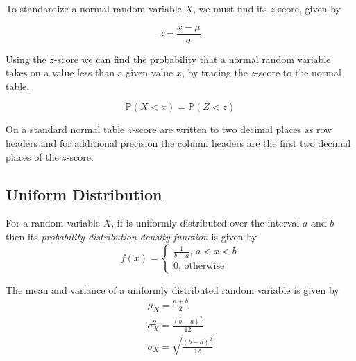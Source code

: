 \documentclass[12pt letter]{report}
\begin{document}


To standardize a normal random variable $X$, we must find its $z$-score, given by

\[
	z - \frac{x - \mu }{\sigma }
\]



Using the $z$-score we can find the probability that a normal random variable takes on a value less than a given value
$x$, by tracing the $z$-score to the normal table.

\[
	\mathbb{P} \left( X < x \right) = \mathbb{P} \left( Z < z \right)
\]

On a standard normal table $z$-score are written to two decimal places as row headers and for additional precision the
column headers are the first two decimal places of the $z$-score.




\subsection{Uniform Distribution}


For a random variable $X$, if is uniformly distributed over the interval $a$ and $b$ then its \textit{probability distribution
	density function} is given by
\[
	f \left( x \right)  = \begin{cases}
		\frac{1}{b - a}, \, a < x < b \\
		0, \, \text{otherwise}
	\end{cases}
\]

The mean and variance of a uniformly distributed random variable is given by
\begin{align*}
	\mu_X = \frac{a + b}{2}                         \\
	\sigma^2_X = \frac{\left( b - a \right)^2 }{12} \\
	\sigma_X = \sqrt{\frac{\left( b - a \right)^2 }{12}}
\end{align*}
\end{document}
